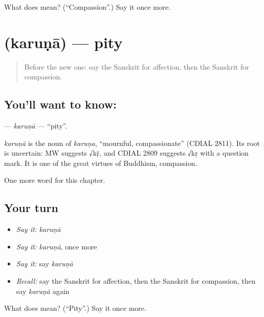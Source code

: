 \begin{tcolorbox}[breakable,colback=teal!4,colframe=teal!35!black,title={Before you move on}]
What does  mean? (\textquotedblleft{}Compassion\textquotedblright{}.) Say it once more.
\end{tcolorbox}
\section[\texorpdfstring{\sk{करुणा} (karuṇā)}{करुणा (karuṇā)}]{ (karuṇā) — pity}

\label{lesson:SA-C239-karuna}



\begin{quote}
Before the new one: say the Sanskrit for affection, then the Sanskrit for compassion.
\end{quote}

\subsection*{You'll want to know: }
\textbf{} — \emph{karuṇā} — \textquotedblleft{}pity\textquotedblright{}.

\begin{cousinweb}
\emph{karuṇā} is the noun of \emph{karuṇa}, \textquotedblleft{}mournful, compassionate\textquotedblright{} (CDIAL 2811). Its root is uncertain: MW suggests √kṝ, and CDIAL 2809 suggests √kṛ with a question mark. It is one of the great virtues of Buddhism, compassion.
\end{cousinweb}

\begin{grammarlens}[title={What you've built}]
One more word for this chapter.
\end{grammarlens}

\subsection*{Your turn}
\begin{itemize}
\raggedright
  \item \emph{Say it:} \emph{karuṇā}
  \item \emph{Say it:} \emph{karuṇā}, once more
  \item \emph{Say it:} say \emph{karuṇā}
  \item \emph{Recall:} say the Sanskrit for affection, then the Sanskrit for compassion, then say \emph{karuṇā} again
\end{itemize}

\begin{tcolorbox}[breakable,colback=teal!4,colframe=teal!35!black,title={Before you move on}]
What does  mean? (\textquotedblleft{}Pity\textquotedblright{}.) Say it once more.
\end{tcolorbox}
